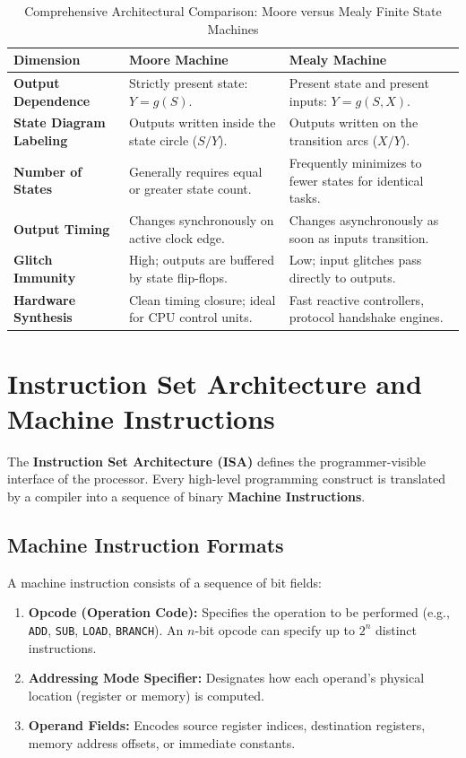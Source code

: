 \begin{table}[htbp]
\centering
\small
\caption{Comprehensive Architectural Comparison: Moore versus Mealy Finite State Machines}
\label{tab:moore_vs_mealy}
\begin{tabularx}{\textwidth}{l X X}
\toprule
\textbf{Dimension} & \textbf{Moore Machine} & \textbf{Mealy Machine} \\
\midrule
\textbf{Output Dependence} & Strictly present state: $Y = g(S)$. & Present state and present inputs: $Y = g(S, X)$. \\
\textbf{State Diagram Labeling} & Outputs written inside the state circle ($S / Y$). & Outputs written on the transition arcs ($X / Y$). \\
\textbf{Number of States} & Generally requires equal or greater state count. & Frequently minimizes to fewer states for identical tasks. \\
\textbf{Output Timing} & Changes synchronously on active clock edge. & Changes asynchronously as soon as inputs transition. \\
\textbf{Glitch Immunity} & High; outputs are buffered by state flip-flops. & Low; input glitches pass directly to outputs. \\
\textbf{Hardware Synthesis} & Clean timing closure; ideal for CPU control units. & Fast reactive controllers, protocol handshake engines. \\
\bottomrule
\end{tabularx}
\end{table}



\section{Instruction Set Architecture and Machine Instructions}
\label{sec:isa_machine_instructions}

The \textbf{Instruction Set Architecture (ISA)} defines the programmer-visible interface of the processor. Every high-level programming construct is translated by a compiler into a sequence of binary \textbf{Machine Instructions}.

\subsection{Machine Instruction Formats}
A machine instruction consists of a sequence of bit fields:
\begin{enumerate}[label=\bfseries\arabic*.]
    \item \textbf{Opcode (Operation Code):} Specifies the operation to be performed (e.g., \texttt{ADD}, \texttt{SUB}, \texttt{LOAD}, \texttt{BRANCH}). An $n$-bit opcode can specify up to $2^n$ distinct instructions.
    \item \textbf{Addressing Mode Specifier:} Designates how each operand's physical location (register or memory) is computed.
    \item \textbf{Operand Fields:} Encodes source register indices, destination registers, memory address offsets, or immediate constants.
\end{enumerate}

